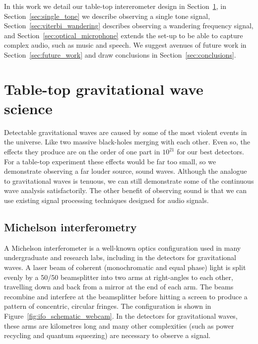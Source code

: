 \documentclass[prb,preprint]{revtex4-1}
\begin{document}
In this work we detail our table-top intererometer design in Section~\ref{sec:ifo}, in Section~\ref{sec:single_tone} we describe observing a single tone signal, Section~\ref{sec:viterbi_wandering} describes observing a wandering frequency signal, and Section~\ref{sec:optical_microphone} extends the set-up to be able to capture complex audio, such as music and speech. We suggest avenues of future work in Section~\ref{sec:future_work} and draw conclusions in Section~\ref{sec:conclusions}.


\section{Table-top gravitational wave science}
\label{sec:ifo}

Detectable gravitational waves are caused by some of the most violent events in the universe. Like two massive black-holes merging with each other\cite{GW150914}. Even so, the effects they produce are on the order of one part in $10^{21}$ for our best detectors\cite{GW150914}. For a table-top experiment these effects would be far too small, so we demonstrate observing a far louder source, sound waves. Although the analogue to gravitational waves is tenuous, we can still demonstrate some of the continuous wave analysis satisfactorily. The other benefit of observing sound is that we can use existing signal processing techniques designed for audio signals.

\subsection{Michelson interferometry}

A Michelson interferometer is a well-known optics configuration used in many undergraduate and research labs, including in the detectors for gravitational waves. A laser beam of coherent (monochromatic and equal phase) light is split evenly by a 50/50 beamsplitter into two arms at right-angles to each other, travelling down and back from a mirror at the end of each arm. The beams recombine and interfere at the beamsplitter before hitting a screen to produce a pattern of concentric, circular fringes. The configuration is shown in Figure~\ref{fig:ifo_schematic_webcam}. In the detectors for gravitational waves, these arms are kilometres long and many other complexities (such as power recycling and quantum squeezing)\cite{GW150914} are necessary to observe a signal.
\end{document}
